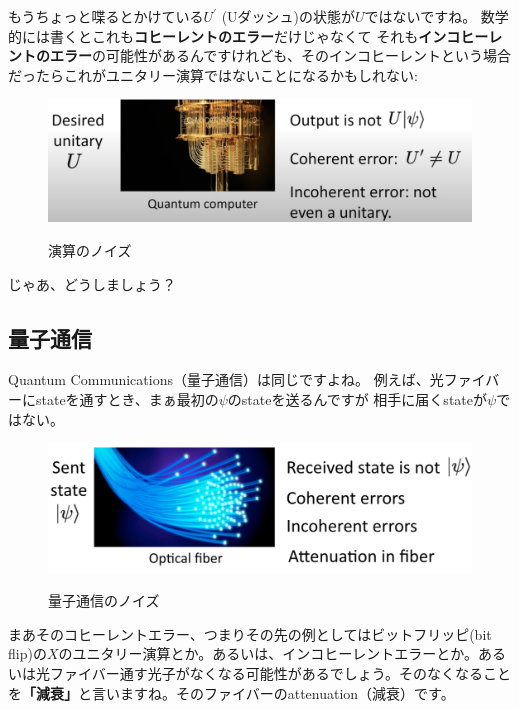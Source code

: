 もうちょっと喋るとかけている$U^\prime$ (Uダッシュ)の状態が$U$ではないですね。
数学的には書くとこれも\textbf{コヒーレントのエラー}だけじゃなくて
それも\textbf{インコヒーレントのエラー}の可能性があるんですけれども、そのインコヒーレントという場合だったらこれがユニタリー演算ではないことになるかもしれない:
\begin{figure}[H]
    \centering
    \includegraphics[width=1.0\textwidth]{lesson3/information_processisng.pdf}
    \label{fig: 1}
    \begin{center}
        \caption{演算のノイズ}
    \end{center}
\end{figure}
じゃあ、どうしましょう？
\subsection{量子通信}
Quantum Communications（量子通信）は同じですよね。
例えば、光ファイバーにstateを通すとき、まぁ最初の$\psi$のstateを送るんですが
相手に届くstateが$\psi$ではない。
\begin{figure}[H]
    \centering
    \includegraphics[width=1.0\textwidth]{lesson3/quantum_communications.pdf}
    \label{fig: 1}
    \begin{center}
        \caption{量子通信のノイズ}
    \end{center}
\end{figure}

まあそのコヒーレントエラー、つまりその先の例としてはビットフリッピ(bit flip)の$X$のユニタリー演算とか。あるいは、インコヒーレントエラーとか。あるいは光ファイバー通す光子がなくなる可能性があるでしょう。そのなくなることを\textbf{「減衰」}と言いますね。そのファイバーのattenuation（減衰）です。
